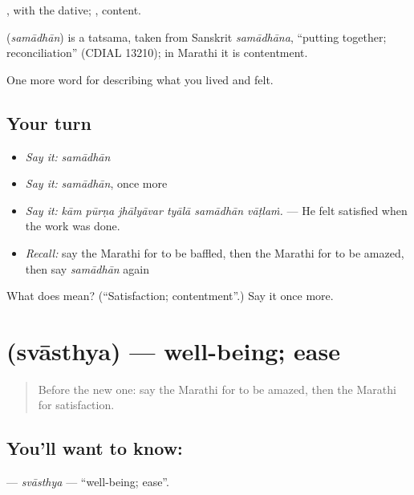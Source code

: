  , with the dative; , content.

\begin{cousinweb}
\textbf{} (\emph{samādhān}) is a tatsama, taken from Sanskrit \emph{samādhāna}, \textquotedblleft{}putting together; reconciliation\textquotedblright{} (CDIAL 13210); in Marathi it is contentment.
\end{cousinweb}

\begin{grammarlens}[title={What you've built}]
One more word for describing what you lived and felt.
\end{grammarlens}

\subsection*{Your turn}
\begin{itemize}
\raggedright
  \item \emph{Say it:} \emph{samādhān}
  \item \emph{Say it:} \emph{samādhān}, once more
  \item \emph{Say it:} \emph{kām pūrṇa jhālyāvar tyālā samādhān vāṭlaṁ.} — He felt satisfied when the work was done.
  \item \emph{Recall:} say the Marathi for to be baffled, then the Marathi for to be amazed, then say \emph{samādhān} again
\end{itemize}

\begin{tcolorbox}[breakable,colback=teal!4,colframe=teal!35!black,title={Before you move on}]
What does  mean? (\textquotedblleft{}Satisfaction; contentment\textquotedblright{}.) Say it once more.
\end{tcolorbox}
\section[\texorpdfstring{\mr{स्वास्थ्य} (svāsthya)}{स्वास्थ्य (svāsthya)}]{ (svāsthya) — well-being; ease}

\label{lesson:MR-C466-svasthya}



\begin{quote}
Before the new one: say the Marathi for to be amazed, then the Marathi for satisfaction.
\end{quote}

\subsection*{You'll want to know: }
\textbf{} — \emph{svāsthya} — \textquotedblleft{}well-being; ease\textquotedblright{}.

